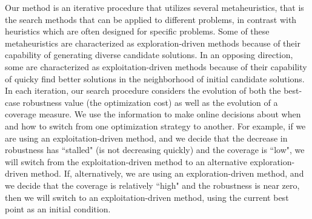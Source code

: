 Our method is an iterative procedure that utilizes several
metaheuristics, that is the search methods that can be applied to
different problems, in contrast with heuristics which are often
designed for specific problems. Some of these metaheuristics are
characterized as exploration-driven methods because of their
capability of generating diverse candidate solutions. In an opposing
direction, some are characterized as exploitation-driven methods
because of their capability of quicky find better solutions in the
neighborhood of initial candidate solutions.  In each iteration, our
search procedure considers the evolution of both the best-case
robustness value (the optimization cost) as well as the evolution of a
coverage measure.  We use the information to make online decisions
about when and how to switch from one optimization strategy to
another.  For example, if we are using an exploitation-driven method,
and we decide that the decrease in robustness has ``stalled" (is not
decreasing quickly) and the coverage is ``low", we will switch from
the exploitation-driven method to an alternative exploration-driven
method.  If, alternatively, we are using an exploration-driven method,
and we decide that the coverage is relatively ``high" and the
robustness is near zero, then we will switch to an exploitation-driven
method, using the current best point as an initial condition.
 







